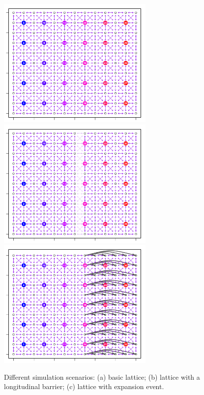 \documentclass[12pt]{article}
\begin{document}
\begin{figure}
	\centering
			{\includegraphics[width=3in,height=2.5in]{figs/sims/basic_lattice.png}}
			{\includegraphics[width=3in,height=2.5in]{figs/sims/barrier_lattice.png}}
			{\includegraphics[width=3in,height=2.5in]{figs/sims/expansion_lattice.png}}
	\caption{Different simulation scenarios: (a) basic lattice; (b) lattice with a longitudinal barrier; (c) lattice with expansion event.}\label{sfig:sim_scenarios}
\end{figure}
\end{document}
